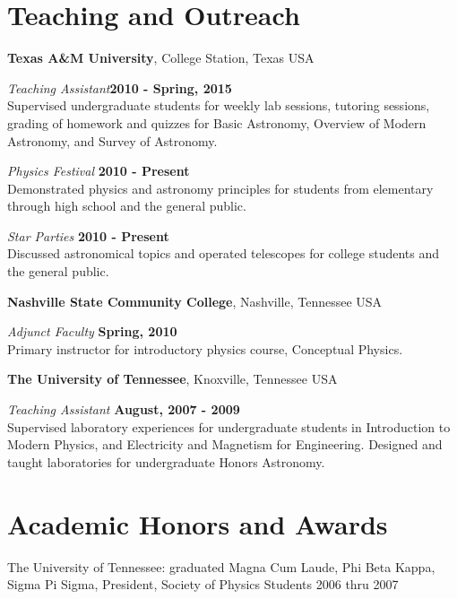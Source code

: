 \documentclass[margin,line, 11pt]{Boada_res}
\begin{document}
\begin{resume}
\section{\sc Teaching and Outreach}
\textbf{Texas A\&M University}, College Station, Texas USA
\vspace{-3mm}

\emph{Teaching Assistant}\hfill \textbf{2010 - Spring, 2015}\\
Supervised undergraduate students for weekly lab sessions, tutoring sessions, grading of homework and quizzes for Basic Astronomy, Overview of Modern Astronomy, and Survey of Astronomy.
\vspace*{-1mm}

\emph{Physics Festival} \hfill \textbf{2010 - Present}\\
Demonstrated physics and astronomy principles for students from elementary through high school and the general public.
\vspace*{-1mm}

\emph{Star Parties} \hfill \textbf{2010 - Present}\\
Discussed astronomical topics and operated telescopes for college students and the general public.
\vspace*{-1mm}

\textbf{Nashville State Community College}, Nashville, Tennessee USA
\vspace{-3mm}

\emph{Adjunct Faculty} \hfill \textbf{Spring, 2010}\\
Primary instructor for introductory physics course, Conceptual Physics.
\vspace*{-1mm}

\textbf{The University of Tennessee}, Knoxville, Tennessee USA
\vspace{-3mm}

\emph{Teaching Assistant} \hfill \textbf{August, 2007 - 2009}\\
Supervised laboratory experiences for undergraduate students in Introduction to Modern Physics, and Electricity and Magnetism for Engineering. Designed and taught laboratories for undergraduate Honors Astronomy.
\vspace*{-3mm}

\section{\sc Academic Honors and Awards} 
The University of Tennessee: graduated Magna Cum Laude, Phi Beta Kappa, Sigma
Pi Sigma, President, Society of Physics Students 2006 thru 2007
\newpage

\end{resume}
\end{document}
